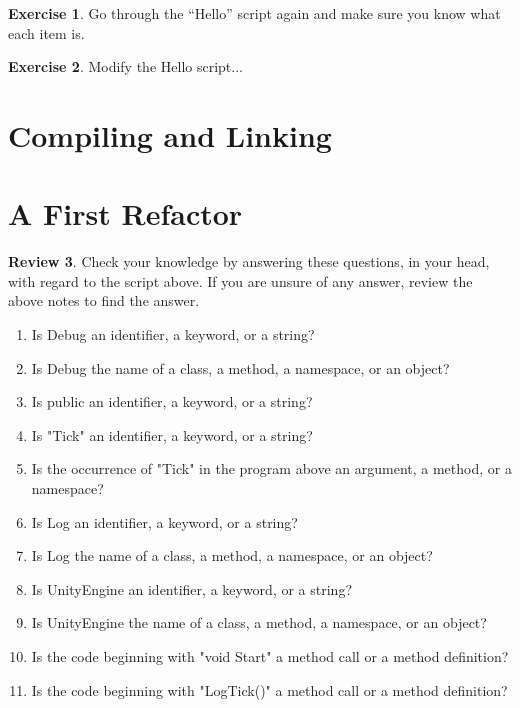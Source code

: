 \documentclass[12pt]{amsbook}
\theoremstyle{definition}
\newtheorem{exercise}{Exercise}[chapter]
\newtheorem{review}[exercise]{Review}
\theoremstyle{remark}
\numberwithin{figure}{chapter}
\numberwithin{table}{chapter}
\numberwithin{section}{chapter}
\numberwithin{equation}{section}
\begin{document}
\begin{exercise}
Go through the “Hello” script again and make sure you know what each item is.  
\end{exercise}

\begin{exercise}
Modify the Hello script...
\end{exercise}

\section{Compiling and Linking}

\section{A First Refactor}

\begin{review}
Check your knowledge by answering these questions, in your head, with regard to the script above.  If you are unsure of any answer, review the above notes to find the answer.
\begin{enumerate}
\item Is Debug an identifier, a keyword, or a string?
\item Is Debug the name of a class, a method, a namespace, or an object?
\item Is public an identifier, a keyword, or a string?
\item Is "Tick" an identifier, a keyword, or a string?
\item Is the occurrence of "Tick" in the program above an argument, a method, or a namespace?
\item Is Log an identifier, a keyword, or a string?
\item Is Log the name of a class, a method, a namespace, or an object?
\item Is UnityEngine an identifier, a keyword, or a string?
\item Is UnityEngine the name of a class, a method, a namespace, or an object?
\item Is the code beginning with "void Start" a method call or a method definition?
\item Is the code beginning with "LogTick()" a method call or a method definition?
\end{enumerate}
\end{review}

\end{document}
